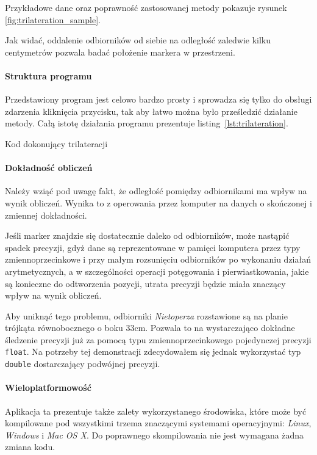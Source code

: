 Przykładowe dane oraz poprawność zastosowanej metody pokazuje rysunek \ref{fig:trilateration_sample}.

Jak widać, oddalenie odbiorników od siebie na odległość zaledwie kilku centymetrów pozwala badać położenie markera w przestrzeni.

\paragraph{Struktura programu}
Przedstawiony program jest celowo bardzo prosty i sprowadza się tylko do obsługi zdarzenia kliknięcia przycisku, tak aby łatwo można było prześledzić działanie metody. Całą istotę działania programu prezentuje listing~\ref{lst:trilateration}.

\begin{listing}
  
  \caption{Kod dokonujący trilateracji}
  \label{lst:trilateration}
\end{listing}

\paragraph{Dokładność obliczeń}
Należy wziąć pod uwagę fakt, że odległość pomiędzy odbiornikami ma wpływ na wynik obliczeń. Wynika to z operowania przez komputer na danych o skończonej i zmiennej dokładności.

Jeśli marker znajdzie się dostatecznie daleko od odbiorników, może nastąpić spadek precyzji, gdyż dane są reprezentowane w pamięci komputera przez typy zmiennoprzecinkowe i przy małym rozsunięciu odbiorników po wykonaniu działań arytmetycznych, a w szczególności operacji potęgowania i pierwiastkowania, jakie są konieczne do odtworzenia pozycji, utrata precyzji będzie miała znaczący wpływ na wynik obliczeń.

Aby uniknąć tego problemu, odbiorniki \textsl{Nietoperza} rozstawione są na planie trójkąta równobocznego o boku 33cm. Pozwala to na wystarczająco dokładne śledzenie precyzji już za pomocą typu zmiennoprzecinkowego pojedynczej precyzji \verb|float|. Na potrzeby tej demonstracji zdecydowałem się jednak wykorzystać typ \verb|double| dostarczający podwójnej precyzji.

\paragraph{Wieloplatformowość}
Aplikacja ta prezentuje także zalety wykorzystanego środowiska, które może być kompilowane pod wszystkimi trzema znaczącymi systemami operacyjnymi: \textsl{Linux}, \textsl{Windows} i \textsl{Mac OS X}. Do poprawnego skompilowania nie jest wymagana żadna zmiana kodu.

